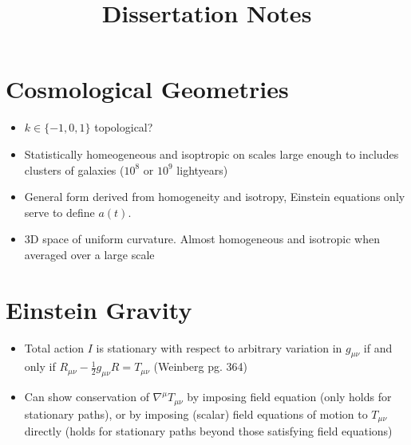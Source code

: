 \documentclass[10pt,letterpaper]{article}
\title{Dissertation Notes}
\date{}
\numberwithin{equation}{section}
\begin{document}
 
\maketitle
\noindent 

\section*{Cosmological Geometries}
\begin{itemize}
	\item $k\in \{-1,0,1\}$ topological?
	\item Statistically homeogeneous and isoptropic on scales large enough to includes clusters of galaxies ($10^8$ or $10^9$ lightyears)
	\item General form derived from homogeneity and isotropy, Einstein equations only serve to define  $a(t)$.
	\item 3D space of uniform curvature. Almost homogeneous and isotropic when averaged over a large scale
\end{itemize}
\section*{Einstein Gravity}
\begin{itemize}
	\item Total action $I$ is stationary with respect to arbitrary variation in $g_{\mu\nu}$ if and only if $R_{\mu\nu} - \frac{1}{2}g_{\mu\nu}R = T_{\mu\nu}$ (Weinberg pg. 364)
	\item Can show conservation of $\nabla^\mu T_{\mu\nu}$ by imposing field equation (only holds for stationary paths), or by imposing (scalar) field equations of motion to $T_{\mu\nu}$ directly (holds for stationary paths beyond those satisfying field equations)
\end{itemize}

\end{document}
